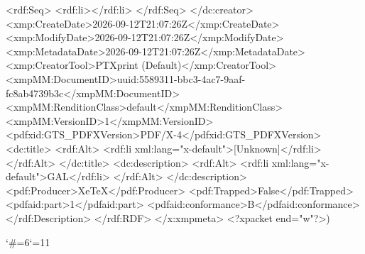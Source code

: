 {          <rdf:Seq>
            <rdf:li></rdf:li>
          </rdf:Seq>
        </dc:creator>
        <xmp:CreateDate>2026-09-12T21:07:26Z</xmp:CreateDate>
        <xmp:ModifyDate>2026-09-12T21:07:26Z</xmp:ModifyDate>
        <xmp:MetadataDate>2026-09-12T21:07:26Z</xmp:MetadataDate>
        <xmp:CreatorTool>PTXprint (Default)</xmp:CreatorTool>
        <xmpMM:DocumentID>uuid:5589311-bbc3-4ac7-9aaf-fc8ab4739b3c</xmpMM:DocumentID>
        <xmpMM:RenditionClass>default</xmpMM:RenditionClass>
        <xmpMM:VersionID>1</xmpMM:VersionID>
        <pdfxid:GTS_PDFXVersion>PDF/X-4</pdfxid:GTS_PDFXVersion>
        <dc:title>
          <rdf:Alt>
            <rdf:li xml:lang="x-default">[Unknown]</rdf:li>
          </rdf:Alt>
        </dc:title>
        <dc:description>
          <rdf:Alt>
            <rdf:li xml:lang="x-default">GAL</rdf:li>
          </rdf:Alt>
        </dc:description>
        <pdf:Producer>XeTeX</pdf:Producer>
        <pdf:Trapped>False</pdf:Trapped>
      <pdfaid:part>1</pdfaid:part>
      <pdfaid:conformance>B</pdfaid:conformance>
      </rdf:Description>
  </rdf:RDF>
</x:xmpmeta>
<?xpacket end="w"?>)}
\egroup
\catcode`\#=6\catcode`\@=11 \activ@tecustomch@rs







